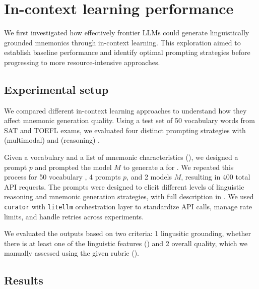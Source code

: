 \section{In-context learning performance} \label{sec:icl-performance}

We first investigated how effectively frontier LLMs could generate linguistically grounded mnemonics through in-context learning. This exploration aimed to establish baseline performance and identify optimal prompting strategies before progressing to more resource-intensive approaches.

\subsection{Experimental setup}
We compared different in-context learning approaches to understand how they affect mnemonic generation quality. Using a test set of 50 vocabulary words from SAT and TOEFL exams, we evaluated four distinct prompting strategies with \xteachermodel (multimodal) and \teachermodel (reasoning) \citep{DeepSeek-AIDEEPSEEKR12025,DeepSeekV32025}.

Given a vocabulary \vocab and a list of mnemonic characteristics (), we designed a prompt $p$ and prompted the model $M$ to generate a \lgm \mnem for \vocab. We repeated this process for 50 vocabulary \vocab, 4 prompts $p$, and 2 models $M$, resulting in 400 total API requests. The prompts were designed to elicit different levels of linguistic reasoning and mnemonic generation strategies, with full description in . We used \verb|curator| \citep{BespokeLabBESPOKE2025} with \verb|litellm| orchestration layer to standardize API calls, manage rate limits, and handle retries across experiments.

We evaluated the outputs based on two criteria: \numlist{1} lingusitic grounding, whether there is at least one of the linguistic features () and \numlist{2} overall quality, which we manually assessed using the given rubric ().

\subsection{Results} \label{sec:icl-results}


